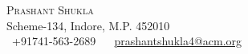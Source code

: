 \documentclass[12pt]{article}
\begin{document}
\begin{center}
    {\Huge \scshape Prashant Shukla} \\ \vspace{5pt}
    Scheme-134, Indore, M.P. 452010 \\ \vspace{3pt}
    \small \faPhone\ +91741-563-2689 ~ \href{mailto:x@gmail.com} \faEnvelope\  \underline{prashantshukla4@acm.org} ~

\end{center}
\end{document}
